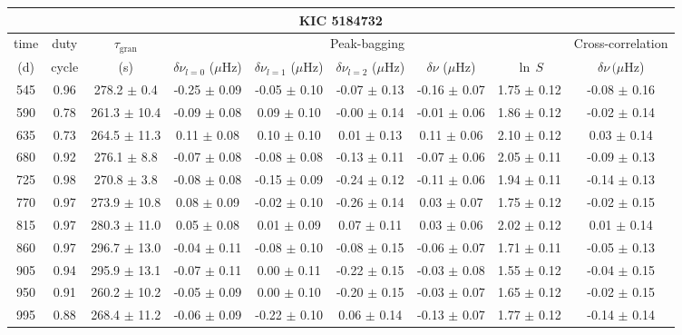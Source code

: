 \documentclass[twocolumn]{aastex61}%
\begin{document}
\begin{table*}[ht]\centering\fontsize{9.}{7.}\selectfont
\begin{tabular}{ccc|ccccc|c}
\multicolumn{9}{c}{KIC 5184732}\\ \hline\hline
time & duty & $\tau_\text{gran}$ &\multicolumn{5}{c|}{Peak-bagging}&Cross-correlation\\
(d)& cycle & (s)&$\delta\nu_{l=0}$ ($\mu$Hz) & $\delta\nu_{l=1}$ ($\mu$Hz) & $\delta\nu_{l=2}$ ($\mu$Hz) & $\delta\nu$ ($\mu$Hz)& $\ln\,S$ & $\delta\nu\,(\mu$Hz)\\\hline
545 & 0.96 & 278.2 $\pm$ 0.4 & -0.25 $\pm$ 0.09 & -0.05 $\pm$ 0.10 & -0.07 $\pm$ 0.13 & -0.16 $\pm$ 0.07 & 1.75 $\pm$ 0.12 & -0.08 $\pm$ 0.16\\
590 & 0.78 & 261.3 $\pm$ 10.4 & -0.09 $\pm$ 0.08 & 0.09 $\pm$ 0.10 & -0.00 $\pm$ 0.14 & -0.01 $\pm$ 0.06 & 1.86 $\pm$ 0.12 & -0.02 $\pm$ 0.14\\
635 & 0.73 & 264.5 $\pm$ 11.3 & 0.11 $\pm$ 0.08 & 0.10 $\pm$ 0.10 & 0.01 $\pm$ 0.13 & 0.11 $\pm$ 0.06 & 2.10 $\pm$ 0.12 & 0.03 $\pm$ 0.14\\
680 & 0.92 & 276.1 $\pm$ 8.8 & -0.07 $\pm$ 0.08 & -0.08 $\pm$ 0.08 & -0.13 $\pm$ 0.11 & -0.07 $\pm$ 0.06 & 2.05 $\pm$ 0.11 & -0.09 $\pm$ 0.13\\
725 & 0.98 & 270.8 $\pm$ 3.8 & -0.08 $\pm$ 0.08 & -0.15 $\pm$ 0.09 & -0.24 $\pm$ 0.12 & -0.11 $\pm$ 0.06 & 1.94 $\pm$ 0.11 & -0.14 $\pm$ 0.13\\
770 & 0.97 & 273.9 $\pm$ 10.8 & 0.08 $\pm$ 0.09 & -0.02 $\pm$ 0.10 & -0.26 $\pm$ 0.14 & 0.03 $\pm$ 0.07 & 1.75 $\pm$ 0.12 & -0.02 $\pm$ 0.15\\
815 & 0.97 & 280.3 $\pm$ 11.0 & 0.05 $\pm$ 0.08 & 0.01 $\pm$ 0.09 & 0.07 $\pm$ 0.11 & 0.03 $\pm$ 0.06 & 2.02 $\pm$ 0.12 & 0.01 $\pm$ 0.14\\
860 & 0.97 & 296.7 $\pm$ 13.0 & -0.04 $\pm$ 0.11 & -0.08 $\pm$ 0.10 & -0.08 $\pm$ 0.15 & -0.06 $\pm$ 0.07 & 1.71 $\pm$ 0.11 & -0.05 $\pm$ 0.13\\
905 & 0.94 & 295.9 $\pm$ 13.1 & -0.07 $\pm$ 0.11 & 0.00 $\pm$ 0.11 & -0.22 $\pm$ 0.15 & -0.03 $\pm$ 0.08 & 1.55 $\pm$ 0.12 & -0.04 $\pm$ 0.15\\
950 & 0.91 & 260.2 $\pm$ 10.2 & -0.05 $\pm$ 0.09 & 0.00 $\pm$ 0.10 & -0.20 $\pm$ 0.15 & -0.03 $\pm$ 0.07 & 1.65 $\pm$ 0.12 & -0.02 $\pm$ 0.15\\
995 & 0.88 & 268.4 $\pm$ 11.2 & -0.06 $\pm$ 0.09 & -0.22 $\pm$ 0.10 & 0.06 $\pm$ 0.14 & -0.13 $\pm$ 0.07 & 1.77 $\pm$ 0.12 & -0.14 $\pm$ 0.14\\

\end{tabular}
\end{table*}
\end{document}
